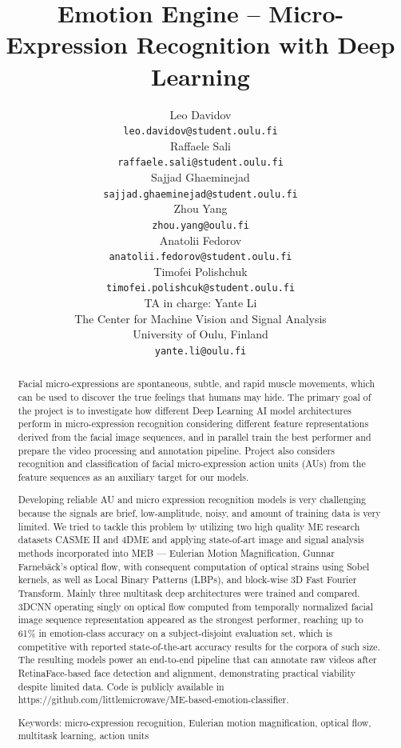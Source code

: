 \documentclass{article}
\title{Emotion Engine – Micro-Expression Recognition with Deep Learning}
\author{%
  Leo Davidov \\
  \texttt{leo.davidov@student.oulu.fi} \\
  \And
  Raffaele Sali \\
  \texttt{raffaele.sali@student.oulu.fi} \\
  \And
  Sajjad Ghaeminejad \\
  \texttt{sajjad.ghaeminejad@student.oulu.fi} \\
  \And
  Zhou Yang \\
  \texttt{zhou.yang@oulu.fi} \\
  \And
  Anatolii Fedorov \\
  \texttt{anatolii.fedorov@student.oulu.fi} \\
  \And
  Timofei Polishchuk \\
    \texttt{timofei.polishcuk@student.oulu.fi} \\
  \And
  TA in charge: Yante Li  \\
  The Center for Machine Vision and Signal Analysis \\
  University of Oulu, Finland \\
    \texttt{yante.li@oulu.fi} \\
}
\begin{document}
\maketitle


\begin{abstract}
Facial micro-expressions are spontaneous, subtle, and rapid muscle movements, which can be used to discover the true feelings that humans may hide. The primary goal of the project is to investigate how different Deep Learning AI model architectures perform in micro-expression recognition considering different feature representations derived from the facial image sequences, and in parallel train the best performer and prepare the video processing and annotation pipeline. Project also considers recognition and classification of facial micro-expression action units (AUs) from the feature sequences as an auxiliary target for our models.

Developing reliable AU and micro expression recognition models is very challenging because the signals are brief, low-amplitude, noisy, and amount of training data is very limited. We tried to tackle this problem by utilizing two high quality ME research datasets CASME II \cite{yan2014} and 4DME\cite{li2023} and applying state-of-art image and signal analysis methods incorporated into MEB \cite{varanka2022, meb2022} — Eulerian Motion Magnification, Gunnar Farnebäck’s optical flow, with consequent computation of optical strains using Sobel kernels, as well as Local Binary Patterns (LBPs), and block-wise 3D Fast Fourier Transform. Mainly three multitask deep architectures were trained and compared. 3DCNN operating singly on optical flow computed from temporally normalized facial image sequence representation appeared as the strongest performer, reaching up to 61\% in emotion-class accuracy on a subject-disjoint evaluation set, which is competitive with reported state-of-the-art accuracy results for the corpora of such size. The resulting models power an end-to-end pipeline that can annotate raw videos after RetinaFace-based face detection and alignment, demonstrating practical viability despite limited data. Code is publicly available in https://github.com/littlemicrowave/ME-based-emotion-classifier.

Keywords: micro-expression recognition, Eulerian motion magnification, optical flow, multitask learning, action units
\end{abstract}


\end{document}
